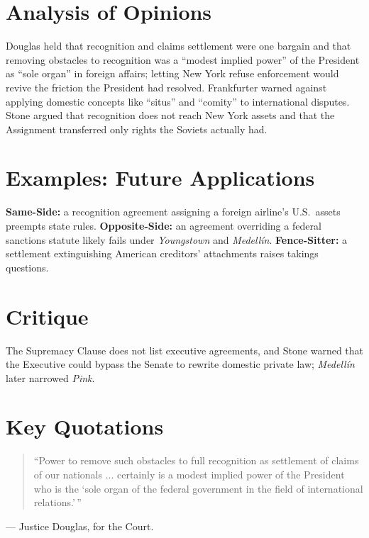 \documentclass[12pt]{article}
\begin{document}
\section{Analysis of Opinions}
Douglas held that recognition and claims settlement were one bargain and that removing obstacles to recognition was a ``modest implied power'' of the President as ``sole organ'' in foreign affairs; letting New York refuse enforcement would revive the friction the President had resolved. Frankfurter warned against applying domestic concepts like ``situs'' and ``comity'' to international disputes. Stone argued that recognition does not reach New York assets and that the Assignment transferred only rights the Soviets actually had.

\section{Examples: Future Applications}
\textbf{Same-Side:} a recognition agreement assigning a foreign airline's U.S.\ assets preempts state rules. \textbf{Opposite-Side:} an agreement overriding a federal sanctions statute likely fails under \textit{Youngstown} and \textit{Medell\'in}. \textbf{Fence-Sitter:} a settlement extinguishing American creditors' attachments raises takings questions.

\section{Critique}
The Supremacy Clause does not list executive agreements, and Stone warned that the Executive could bypass the Senate to rewrite domestic private law; \textit{Medell\'in} later narrowed \textit{Pink}.

\section{Key Quotations}
\begin{quote}
``Power to remove such obstacles to full recognition as settlement of claims of our nationals ... certainly is a modest implied power of the President who is the `sole organ of the federal government in the field of international relations.'\,''
\end{quote}
\noindent --- Justice Douglas, for the Court.
\end{document}
